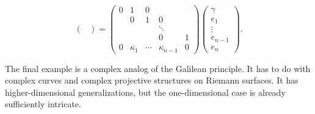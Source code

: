 \begin{example}
\[\begin{pmatrix}
    \end{pmatrix}=\begin{pmatrix}
        0 & 1 & 0 &  & \\
         & 0 & 1 & 0 &     \\
        & &  & \ddots & \\
         & & & 0 & 1\\
        0 & \kappa_1 & \cdots & \kappa_{n-1}& 0
    \end{pmatrix}\begin{pmatrix}
        \gamma \\ e_1 \\ \vdots \\ e_{n-1} \\ e_n
        \end{pmatrix}.\]
\end{example}

The final example is a complex analog of the Galilean principle. It has to do with complex curves and complex projective structures on Riemann surfaces. It has higher-dimensional generalizations, but the one-dimensional case is already sufficiently intricate.

